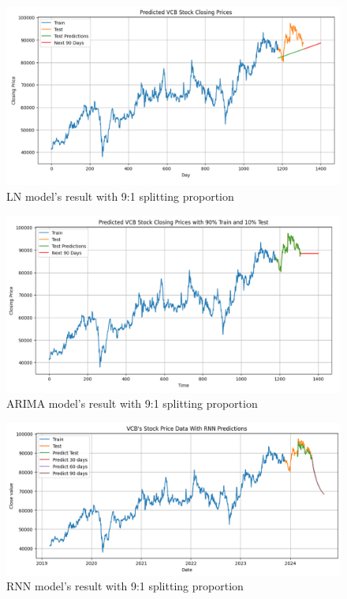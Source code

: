 \documentclass{ieeeojies}
\begin{document}
\begin{figure}[H]
  \centering
  \begin{minipage}{0.8\linewidth}
    \centering
    \includegraphics[width=\linewidth]{bibliography/VCB-LN-9-1.png}
    \caption{LN model's result with 9:1 splitting proportion}
    \label{fig8}
  \end{minipage}
\end{figure}
\begin{figure}[H]
  \centering
  \begin{minipage}{0.8\linewidth}
    \centering
    \includegraphics[width=\linewidth]{bibliography/VCB-ARIMA-9-1.png}
    \caption{ARIMA model's result with 9:1 splitting proportion}
    \label{fig8}
  \end{minipage}
\end{figure}
\begin{figure}[H]
  \centering
  \begin{minipage}{0.8\linewidth}
    \centering
    \includegraphics[width=\linewidth]{bibliography/VCB-RNN-9-1.png}
    \caption{RNN model's result with 9:1 splitting proportion}
    \label{fig8}
  \end{minipage}
\end{figure}
\end{document}
